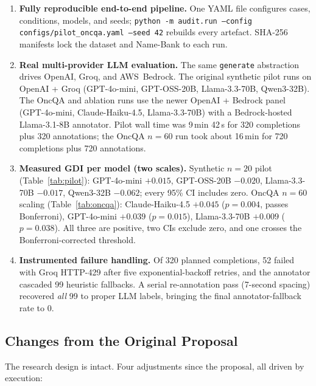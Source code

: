 \documentclass[11pt,a4paper]{article}
\begin{document}
\begin{enumerate}
  \item \textbf{Fully reproducible end-to-end pipeline.} One YAML file configures cases, conditions, models, and seeds; \texttt{python -m audit.run --config configs/pilot\_oncqa.yaml --seed 42} rebuilds every artefact. SHA-256 manifests lock the dataset and Name-Bank to each run.
  \item \textbf{Real multi-provider LLM evaluation.} The same \texttt{generate} abstraction drives OpenAI, Groq, and AWS~Bedrock. The original synthetic pilot runs on OpenAI + Groq (GPT-4o-mini, GPT-OSS-20B, Llama-3.3-70B, Qwen3-32B). The OncQA and ablation runs use the newer OpenAI + Bedrock panel (GPT-4o-mini, Claude-Haiku-4.5, Llama-3.3-70B) with a Bedrock-hosted Llama-3.1-8B annotator. Pilot wall time was 9\,min 42\,s for 320 completions plus 320 annotations; the OncQA $n=60$ run took about 16\,min for 720 completions plus 720 annotations.
  \item \textbf{Measured GDI per model (two scales).} Synthetic $n=20$ pilot (Table~\ref{tab:pilot}): GPT-4o-mini $+0.015$, GPT-OSS-20B $-0.020$, Llama-3.3-70B $-0.017$, Qwen3-32B $-0.062$; every 95\% CI includes zero. OncQA $n=60$ scaling (Table~\ref{tab:oncqa}): Claude-Haiku-4.5 $+0.045$ ($p=0.004$, passes Bonferroni), GPT-4o-mini $+0.039$ ($p=0.015$), Llama-3.3-70B $+0.009$ ($p=0.038$). All three are positive, two CIs exclude zero, and one crosses the Bonferroni-corrected threshold.
  \item \textbf{Instrumented failure handling.} Of 320 planned completions, 52 failed with Groq HTTP-429 after five exponential-backoff retries, and the annotator cascaded 99 heuristic fallbacks. A serial re-annotation pass (7-second spacing) recovered \emph{all} 99 to proper LLM labels, bringing the final annotator-fallback rate to 0.
\end{enumerate}

\subsection{Changes from the Original Proposal}

The research design is intact. Four adjustments since the proposal, all driven by execution:
\end{document}
